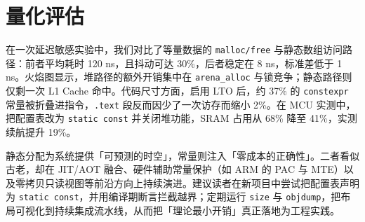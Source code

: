 \chapter{量化评估}
在一次延迟敏感实验中，我们对比了等量数据的 \texttt{malloc/free} 与静态数组访问路径：前者平均耗时 120 ns，且抖动可达 30\%{}，后者稳定在 8 ns，标准差低于 1 ns。火焰图显示，堆路径的额外开销集中在 \texttt{arena\_{}alloc} 与锁竞争；静态路径则仅剩一次 L1 Cache 命中。代码尺寸方面，启用 LTO 后，约 37\%{} 的 \texttt{constexpr} 常量被折叠进指令，\texttt{.text} 段反而因少了一次访存而缩小 2\%{}。在 MCU 实测中，把配置表改为 \texttt{static const} 并关闭堆功能，SRAM 占用从 68\%{} 降至 41\%{}，实测续航提升 19\%{}。\par
静态分配为系统提供「可预测的时空」，常量则注入「零成本的正确性」。二者看似古老，却在 JIT/AOT 融合、硬件辅助常量保护（如 ARM 的 PAC 与 MTE）以及零拷贝只读视图等前沿方向上持续演进。建议读者在新项目中尝试把配置表声明为 \texttt{static const}，并用编译期断言拦截越界；定期运行 \texttt{size} 与 \texttt{objdump}，把布局可视化到持续集成流水线，从而把「理论最小开销」真正落地为工程实践。\par
